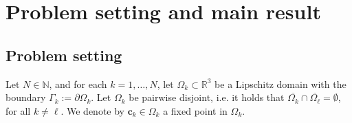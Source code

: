 \documentclass[]{article}
\numberwithin{equation}{section}
\numberwithin{theorem}{section}
\numberwithin{lemma}{section}
\numberwithin{corollary}{section}
\numberwithin{proposition}{section}
\numberwithin{definition}{section}
\begin{document}
	\section{Problem setting and main result}
	\label{sec:prob_set_and_main_result}
	\subsection{Problem setting}
	Let $ N \in \mathbb{N} $, and for each $ k = 1, \dots, N $, let $ \Omega_k \subset \mathbb{R}^3 $ be a Lipschitz domain with the boundary $\Gamma_k := \partial \Omega_k$.  Let $\Omega_k$ be pairwise disjoint, i.e. it holds that $\overline{\Omega_k} \cap \overline{\Omega_\ell} = \emptyset$, for all $k \neq \ell$. We denote by $ \boldsymbol{c}_k \in \Omega_k$ a fixed point in $\Omega_k$. 
	
\end{document}
